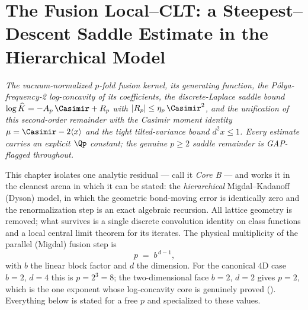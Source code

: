 %

\chapter{The Fusion Local--CLT: a Steepest--Descent Saddle Estimate in the
  Hierarchical Model}
\label{ch:core-b-local-clt}

\noindent\emph{The vacuum-normalized $p$-fold \SUtwo{} fusion kernel, its
generating function, the Pólya-frequency-2 log-concavity of its coefficients, the
discrete-Laplace saddle bound $\log \widehat K = -A_p\,\Casimir + R_p$ with
$|R_p|\le\eta_p\,\Casimir^{2}$, and the unification of this second-order remainder
with the Casimir moment identity $\mu = \Casimir - 2\langle x\rangle$ and the tight
tilted-variance bound $d^2 x\le 1$.  Every estimate carries an explicit $\Qp$
constant; the genuine $p\ge 2$ saddle remainder is GAP-flagged throughout.}

\medskip

This chapter isolates one analytic residual — call it \emph{Core B} — and works it
in the cleanest arena in which it can be stated: the \emph{hierarchical}
Migdal--Kadanoff (Dyson) model, in which the geometric bond-moving error is
identically zero and the renormalization step is an exact algebraic recursion.  All
lattice geometry is removed; what survives is a single discrete convolution
identity on \SUtwo{} class functions and a local central limit theorem for its
iterates.  The physical multiplicity of the parallel (Migdal) fusion step is
\[
  p \;=\; b^{\,d-1},
\]
with $b$ the linear block factor and $d$ the dimension.  For the canonical $4$D
case $b=2$, $d=4$ this is $p = 2^{3} = 8$; the two-dimensional face $b=2$, $d=2$
gives $p = 2$, which is the one exponent whose log-concavity core is genuinely
proved ().  Everything below is stated for a free $p$ and
specialized to these values.

